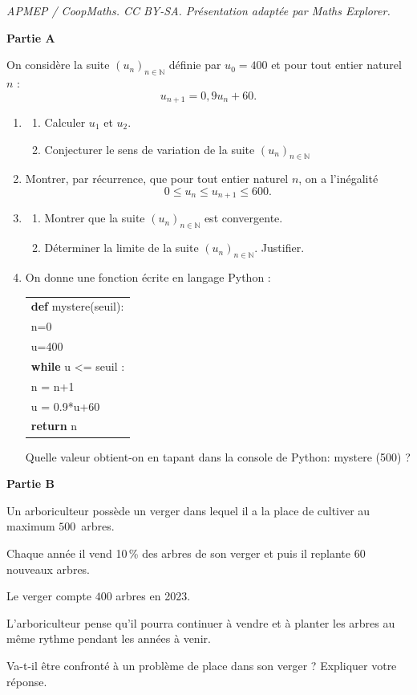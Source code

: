 \documentclass[10pt]{article}
\providecommand{\N}{\mathbb{N}}
\begin{document}
\noindent\textit{APMEP / CoopMaths. CC BY-SA. Présentation adaptée par Maths Explorer.}\par\medskip
\medskip

\textbf{Partie A}

\medskip

On considère la suite $\left(u_n\right)_{n\in \N}$ définie par $u_0 = 400$ et pour tout entier naturel $n$ : 
\[u_{n+1} = 0,9u_n + 60.\]

\begin{enumerate}
\item
	\begin{enumerate}
		\item Calculer $u_1$ et $u_2$.
		\item Conjecturer le sens de variation de la suite $\left(u_n\right)_{n\in \N}$
	\end{enumerate}	
\item Montrer, par récurrence, que pour tout entier naturel $n$, on a l'inégalité 
\[0  \leqslant u_n  \leqslant u_{n+1} \leqslant  600.\]
\item 
	\begin{enumerate}
		\item Montrer que la suite $\left(u_n\right)_{n\in \N}$ est convergente.
		\item Déterminer la limite de la suite $\left(u_n\right)_{n\in \N}$. Justifier.
	\end{enumerate}
\item On donne une fonction écrite en langage Python :

\begin{center}
\begin{tabularx}{0.4\linewidth}{|X|}\hline
\textbf{def} mystere(seuil):\\
\qquad n=0\\
\qquad u=400\\
\qquad \textbf{while} u <= seuil :\\
\qquad \qquad n = n+1\\
\qquad \qquad u = 0.9*u+60\\
\qquad \textbf{return} n\\ \hline
\end{tabularx}
\end{center}

Quelle valeur obtient-on en tapant dans la console de Python: mystere (500) ?
\end{enumerate}

\medskip

\textbf{Partie B}

\medskip

Un arboriculteur possède un verger dans lequel il a la place de cultiver au maximum $500$~arbres.

Chaque année il vend 10\,\% des arbres de son verger et puis il replante $60$ nouveaux arbres.

Le verger compte $400$ arbres en 2023.

L'arboriculteur pense qu'il pourra continuer à vendre et à planter les arbres au même rythme pendant les années à venir.

Va-t-il être confronté à un problème de place dans son verger ? Expliquer votre réponse.
\end{document}
